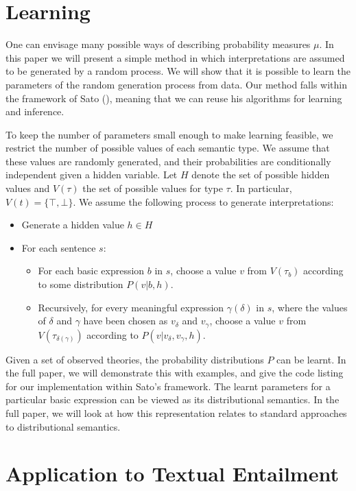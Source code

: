 \documentclass[letterpaper]{article}
\begin{document}
\section{Learning}

One can envisage many possible ways of describing probability measures
$\mu$. In this paper we will present a simple method in which
interpretations are assumed to be generated by a random process. We
will show that it is possible to learn the parameters of the random
generation process from data. Our method falls within the framework of
Sato (\citeyear{Sato:95}), meaning that we can reuse his algorithms
for learning and inference.

To keep the number of parameters small enough to make learning
feasible, we restrict the number of possible values of each semantic
type. We assume that these values are randomly generated, and their
probabilities are conditionally independent given a hidden
variable. Let $H$ denote the set of possible hidden values and $V(\tau)$  the
set of possible values for type $\tau$. In particular, $V(t) = \{\top, \bot\}$. We assume the following process to generate
interpretations:
\begin{itemize}
\item Generate a hidden value $h\in H$
\item For each sentence $s$:
\begin{itemize}
\item For each basic expression $b$ in $s$, choose a value $v$ from
  $V(\tau_b)$ according to some distribution $P(v|b,h)$.
\item Recursively, for every meaningful expression $\gamma(\delta)$ in
  $s$, where the values of $\delta$ and $\gamma$ have been chosen as
  $v_\delta$ and $v_\gamma$, choose a value $v$ from
  $V(\tau_{\delta(\gamma)})$ according to $P(v|v_\delta, v_\gamma,
  h)$.
\end{itemize}
\end{itemize}


Given a set of observed theories, the probability distributions $P$
can be learnt. In the full paper, we will demonstrate this with
examples, and give the code listing for our implementation within
Sato's framework. The learnt parameters for a particular basic
expression can be viewed as its distributional semantics. In the full
paper, we will look at how this representation relates to standard
approaches to distributional semantics.

\section{Application to Textual Entailment}
\end{document}
